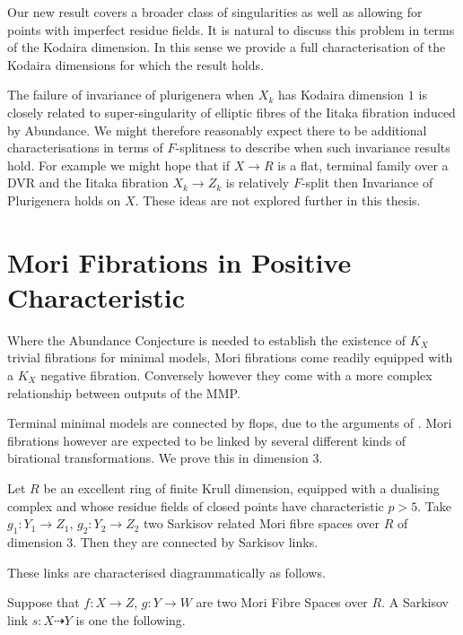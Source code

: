 \documentclass[a4paper,12pt]{book}
\let \OldSection \section
\renewcommand{\section}[1]{\OldSection{#1} \thispagestyle{section}}
\begin{document}
	Our new result covers a broader class of singularities as well as allowing for points with imperfect residue fields. It is natural to discuss this problem in terms of the Kodaira dimension. In this sense we provide a full characterisation of the Kodaira dimensions for which the result holds.
	
	The failure of invariance of plurigenera when $X_{k}$ has Kodaira dimension $1$ is closely related to super-singularity of elliptic fibres of the Iitaka fibration induced by Abundance. We might therefore reasonably expect there to be additional characterisations in terms of $F$-splitness to describe when such invariance results hold. For example we might hope that if $X \to R$ is a flat, terminal family over a DVR and the Iitaka fibration $X_{k}\to Z_{k}$ is relatively $F$-split then Invariance of Plurigenera holds on $X$. These ideas are not explored further in this thesis.
	
	
	\section{Mori Fibrations in Positive Characteristic}
	
	Where the Abundance Conjecture is needed to establish the existence of $K_{X}$ trivial fibrations for minimal models, Mori fibrations come readily equipped with a $K_{X}$ negative fibration. Conversely however they come with a more complex relationship between outputs of the MMP. 
	
	Terminal minimal models are connected by flops, due to the arguments of \cite{kawamata2008flops}. Mori fibrations however are expected to be linked by several different kinds of birational transformations. We prove this in dimension $3$.
	
	\begin{theo}
		Let $R$ be an excellent ring of finite Krull dimension, equipped with a dualising complex and whose residue fields of closed points have characteristic $p>5$. Take $g_{1}:Y_{1} \to Z_{1}$, $g_{2}:Y_{2} \to Z_{2}$ two Sarkisov related Mori fibre spaces over $R$ of dimension $3$. Then they are connected by Sarkisov links.
	\end{theo}
	
	These links are characterised diagrammatically as follows.
	
	Suppose that $f:X \to Z$, $g:Y \to W$ are two Mori Fibre Spaces over $R$. A Sarkisov link $s:X \dashrightarrow Y$ is one the following.
	
\end{document}
